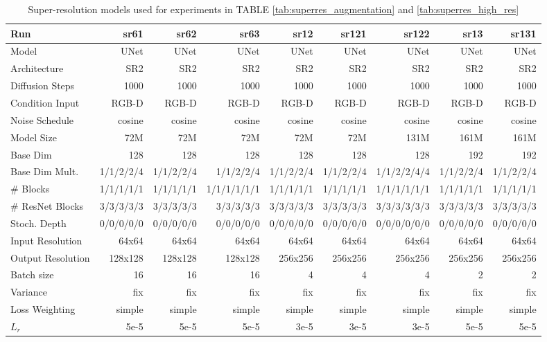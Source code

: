 \begin{table}[t]
\tiny
\centering
\caption{Super-resolution models used for experiments in TABLE \ref{tab:superres_augmentation} and \ref{tab:superres_high_res}}
\label{tab:experiment_model_description_superres_augmentation}
\begin{tabular}{ l || r r r || r r r | r r }
\textbf{Run} & \textbf{sr61} & \textbf{sr62} & \textbf{sr63} & \textbf{sr12} & \textbf{sr121} & \textbf{sr122} & \textbf{sr13} & \textbf{sr131} \\ 
\hline
\hline
 Model & UNet & UNet & UNet & UNet & UNet & UNet & UNet & UNet\\
 Architecture & SR2 & SR2 & SR2 & SR2 & SR2 & SR2 & SR2 & SR2\\
 Diffusion Steps & 1000 & 1000 & 1000 & 1000 & 1000 & 1000 & 1000 & 1000 \\
 Condition Input & RGB-D & RGB-D & RGB-D & RGB-D & RGB-D & RGB-D & RGB-D & RGB-D \\
 Noise Schedule & cosine & cosine & cosine & cosine & cosine & cosine & cosine & cosine \\
 Model Size & 72M & 72M & 72M & 72M & 72M & 131M & 161M & 161M \\
 Base Dim & 128 & 128 & 128 & 128 & 128 & 128 & 192 & 192 \\
 Base Dim Mult. & 1/1/2/2/4 & 1/1/2/2/4 & 1/1/2/2/4 & 1/1/2/2/4 & 1/1/2/2/4 & 1/1/2/2/4/4 & 1/1/2/2/4 & 1/1/2/2/4 \\
 \# Blocks & 1/1/1/1/1 & 1/1/1/1/1 & 1/1/1/1/1/1 & 1/1/1/1/1 & 1/1/1/1/1 & 1/1/1/1/1/1 & 1/1/1/1/1 & 1/1/1/1/1 \\
 \# ResNet Blocks & 3/3/3/3/3 & 3/3/3/3/3 & 3/3/3/3/3 & 3/3/3/3/3 & 3/3/3/3/3 & 3/3/3/3/3/3 & 3/3/3/3/3 & 3/3/3/3/3 \\
 Stoch. Depth & 0/0/0/0/0 & 0/0/0/0/0  & 0/0/0/0/0 & 0/0/0/0/0 & 0/0/0/0/0 & 0/0/0/0/0/0 & 0/0/0/0/0 & 0/0/0/0/0 \\
 Input Resolution & 64x64 & 64x64 & 64x64 & 64x64 & 64x64 & 64x64 & 64x64 & 64x64 \\
 Output Resolution & 128x128 & 128x128 & 128x128 & 256x256 & 256x256 & 256x256 & 256x256 & 256x256 \\
 Batch size & 16 & 16 & 16 & 4 & 4 & 4 & 2 & 2\\
 Variance & fix & fix & fix & fix & fix & fix & fix & fix \\
 Loss Weighting & simple & simple & simple & simple & simple & simple & simple & simple \\
 $L_r$ & 5e-5 & 5e-5 & 5e-5 & 3e-5 & 3e-5 & 3e-5 & 5e-5 & 5e-5 \\

\end{tabular}
\end{table}
